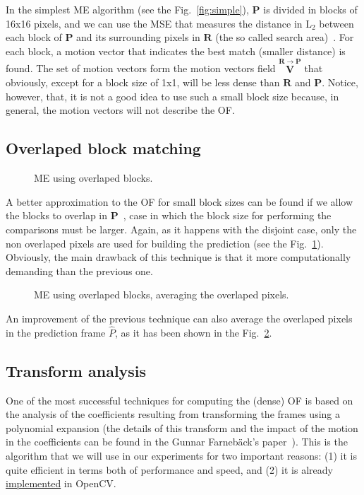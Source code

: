 In the simplest ME algorithm (see the Fig.~\ref{fig:simple}),
${\mathbf P}$ is divided in blocks of 16x16 pixels, and we can use the
MSE that measures the distance in L$_2$ between each block of
${\mathbf P}$ and its surrounding pixels in ${\mathbf R}$ (the so
called search area)~\cite{zhu2000new}. For each block, a motion vector
that indicates the best match (smaller distance) is found. The set of
motion vectors form the motion vectors field $\overset{{\mathbf
    R}\rightarrow {\mathbf P}}{\mathbf V}$ that obviously, except for
a block size of 1x1, will be less dense than ${\mathbf R}$ and
${\mathbf P}$. Notice, however, that, it is not a good idea to use
such a small block size because, in general, the motion vectors will
not describe the OF.

\subsection{Overlaped block matching}

\begin{figure}
  \centering
  \caption{ME using overlaped blocks.}
  \label{fig:overlaped}
\end{figure}

A better approximation to the OF for small block sizes can be found if
we allow the blocks to overlap in ${\mathbf
  P}$~\cite{orchard1994overlapped}, case in which the block size for
performing the comparisons must be larger. Again, as it happens with the
disjoint case, only the non overlaped pixels are used for building the
prediction (see the Fig.~\ref{fig:overlaped}). Obviously, the main
drawback of this technique is that it more computationally demanding
than the previous one.

\begin{figure}
  \centering
  \caption{ME using overlaped blocks, averaging the overlaped pixels.}
  \label{fig:average}
\end{figure}

An improvement of the previous technique can also average the
overlaped pixels in the prediction frame $\hat{P}$, as it has been
shown in the Fig.~\ref{fig:average}.

\subsection{Transform analysis}
One of the most successful techniques for computing the (dense) OF is
based on the analysis of the coefficients resulting from transforming
the frames using a polynomial expansion (the details of this transform
and the impact of the motion in the coefficients can be found in the
Gunnar Farneb{\"a}ck's paper~\cite{farneback2003two}). This is the
algorithm that we will use in our experiments for two important
reasons: (1) it is quite efficient in terms both of performance and
speed, and (2) it is already
\href{https://docs.opencv.org/3.4/d4/dee/tutorial_optical_flow.html}{implemented}
in OpenCV.

